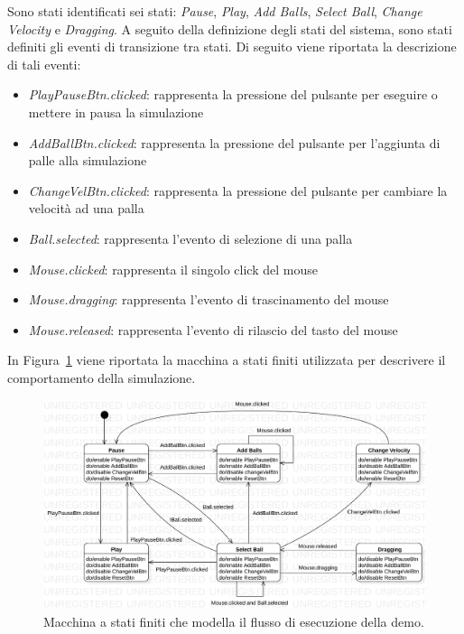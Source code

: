 Sono stati identificati sei stati: \textit{Pause}, \textit{Play}, \textit{Add Balls}, \textit{Select Ball},
\textit{Change Velocity} e \textit{Dragging}.
A seguito della definizione degli stati del sistema, sono stati definiti gli eventi di transizione tra stati.
Di seguito viene riportata la descrizione di tali eventi:
\begin{itemize}
    \item \textit{PlayPauseBtn.clicked}: rappresenta la pressione del pulsante per eseguire o mettere in pausa la
    simulazione
    \item \textit{AddBallBtn.clicked}: rappresenta la pressione del pulsante per l'aggiunta di palle alla simulazione
    \item \textit{ChangeVelBtn.clicked}: rappresenta la pressione del pulsante per cambiare la velocità ad una palla
    \item \textit{Ball.selected}: rappresenta l'evento di selezione di una palla
    \item \textit{Mouse.clicked}: rappresenta il singolo click del mouse
    \item \textit{Mouse.dragging}: rappresenta l'evento di trascinamento del mouse
    \item \textit{Mouse.released}: rappresenta l'evento di rilascio del tasto del mouse
\end{itemize}

In Figura~\ref{fig:fsm-demo} viene riportata la macchina a stati finiti utilizzata per descrivere il comportamento
della simulazione.

\begin{figure}[H]
    \centering
    \includegraphics[width=\textwidth]{img/fsm-demo}
    \caption{Macchina a stati finiti che modella il flusso di esecuzione della demo.}\label{fig:fsm-demo}
\end{figure}

